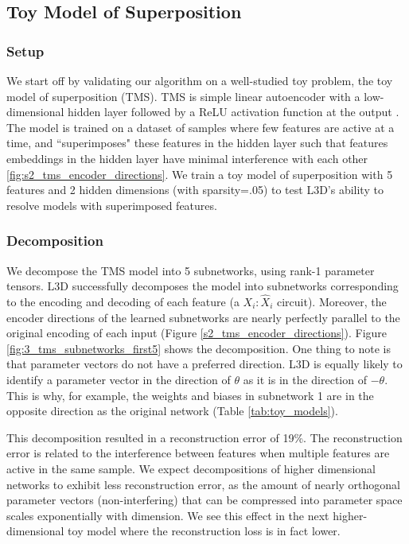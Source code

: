 \documentclass{article}
\theoremstyle{plain}
\theoremstyle{definition}
\theoremstyle{remark}
\begin{document}
\subsection{Toy Model of Superposition}

\subsubsection{Setup}

We start off by validating our algorithm on a well-studied toy problem, the toy model of superposition (TMS). TMS is simple linear autoencoder with a low-dimensional hidden layer followed by a ReLU activation function at the output \cite{elhage2022toy}. The model is trained on a dataset of samples where few features are active at a time, and ``superimposes" these features in the hidden layer such that features embeddings in the hidden layer have minimal interference with each other \ref{fig:s2_tms_encoder_directions}. We train a toy model of superposition with 5 features and 2 hidden dimensions (with sparsity=.05) to test L3D's ability to resolve models with superimposed features.

\subsubsection{Decomposition}

We decompose the TMS model into 5 subnetworks, using rank-1 parameter tensors.  L3D successfully decomposes the model into subnetworks corresponding to the encoding and decoding of each feature (a $X_i:\hat{X}_i$ circuit). Moreover, the encoder directions of the learned subnetworks are nearly perfectly parallel to the original encoding of each input (Figure \ref{s2_tms_encoder_directions}). Figure \ref{fig:3_tms_subnetworks_first5} shows the decomposition. One thing to note is that parameter vectors do not have a preferred direction. L3D is equally likely to identify a parameter vector in the direction of $\theta$ as it is in the direction of $-\theta$. This is why, for example, the weights and biases in subnetwork 1 are in the opposite direction as the original network (Table \ref{tab:toy_models}).

This decomposition resulted in a reconstruction error of 19\%. The reconstruction error is related to the interference between features when multiple features are active in the same sample. We expect decompositions of higher dimensional networks to exhibit less reconstruction error, as the amount of nearly orthogonal parameter vectors (non-interfering) that can be compressed into parameter space scales exponentially with dimension. We see this effect in the next higher-dimensional toy model where the reconstruction loss is in fact lower. 
\end{document}

